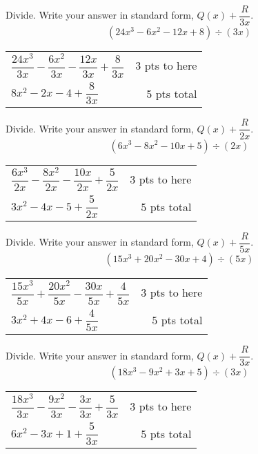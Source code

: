 {
	Divide. Write your answer in standard form, $Q(x)+\dfrac{R}{3x}$.
	$$(24x^3-6x^2-12x+8)\div(3x)$$
}
{
	\begin{tabular}{l r}
	$\dfrac{24x^3}{3x}-\dfrac{6x^2}{3x}-\dfrac{12x}{3x}+\dfrac{8}{3x}$ & 3 pts to here\\
	$8x^2-2x-4+\dfrac{8}{3x} $ & 5 pts total
	\end{tabular}
}

{
	Divide. Write your answer in standard form, $Q(x)+\dfrac{R}{2x}$.
	$$(6x^3-8x^2-10x+5)\div(2x)$$
}
{
	\begin{tabular}{l r}
	$\dfrac{6x^3}{2x}-\dfrac{8x^2}{2x}-\dfrac{10x}{2x}+\dfrac{5}{2x}$  & 3 pts to here\\
	$3x^2-4x-5+\dfrac{5}{2x}$ &  5 pts total
	\end{tabular}
}

{
	Divide. Write your answer in standard form, $Q(x)+\dfrac{R}{5x}$.
	$$(15x^3+20x^2-30x+4)\div(5x)$$
}
{
	\begin{tabular}{l r}
	$\dfrac{15x^3}{5x}+\dfrac{20x^2}{5x}-\dfrac{30x}{5x}+\dfrac{4}{5x}$  & 3 pts to here\\
	$3x^2+4x-6+\dfrac{4}{5x}$ &  5 pts total
	\end{tabular}
}

{
	Divide. Write your answer in standard form, $Q(x)+\dfrac{R}{3x}$.
	$$(18x^3-9x^2+3x+5)\div(3x)$$
}
{
	\begin{tabular}{l r}
	$\dfrac{18x^3}{3x}-\dfrac{9x^2}{3x}-\dfrac{3x}{3x}+\dfrac{5}{3x}$ & 3 pts to here\\
	$6x^2-3x+1+\dfrac{5}{3x} $ & 5 pts total
	\end{tabular}
}
